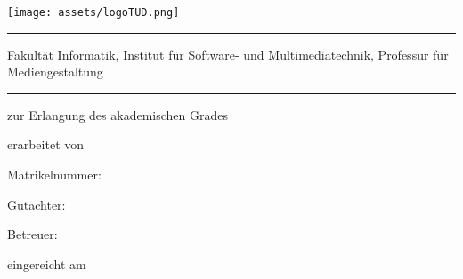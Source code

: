 \begin{titlepage}
	\RaggedRight
	\texttt{[image: assets/logoTUD.png]}\par\vspace{0cm}
	\noindent\rule{\textwidth}{0.4pt}
	{\normalfont\mdseries\small\sffamily Fakultät Informatik,}
	{\normalfont\mdseries\small\sffamily Institut für Software- und Multimediatechnik, Professur für Mediengestaltung}
	\vspace{-2mm}\noindent\hrule
	\vspace{3cm}
	{\normalfont\Large \par}
	\vspace{1cm}
	{\normalfont\Huge\mdseries\sffamily \thetitle\par}
	\vspace{1.5cm}
	{\normalfont\large zur Erlangung des akademischen Grades\par}
	{\normalfont\Large\bfseries \degreetype \par}
	\vspace{1cm}
	{\sffamily\large\mdseries erarbeitet von\par}
	\vspace{1.5mm}
	{\normalfont\Large \theauthor\par}
	\vspace{0.5mm}
	{\normalfont\large Matrikelnummer: \matnr \par}
	\vspace{3.0cm}
	{\sffamily\large Gutachter:\par}
    \vspace{1mm}
	{\normalfont\large \gutachter \par}
	\vspace{7mm}
	{\sffamily\large Betreuer:\par}
	\vspace{0.7mm}
	{\normalfont\large \betreuer \par}
	\vspace{1cm}
	{\sffamily\large\mdseries eingereicht am\par}
	\vspace{1mm}
	{\normalfont\normalsize \thedate\par}
\end{titlepage}
